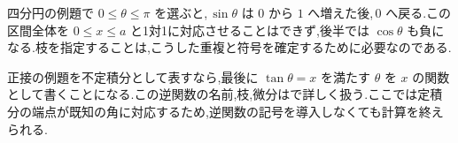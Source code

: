 四分円の例題で $0\le\theta\le\pi$ を選ぶと,\,$\sin\theta$ は $0$ から $1$ へ増えた後,\,$0$ へ戻る.この区間全体を $0\le x\le a$ と1対1に対応させることはできず,後半では $\cos\theta$ も負になる.枝を指定することは,こうした重複と符号を確定するために必要なのである.

正接の例題を不定積分として表すなら,最後に $\tan\theta=x$ を満たす $\theta$ を $x$ の関数として書くことになる.この逆関数の名前,枝,微分はで詳しく扱う.ここでは定積分の端点が既知の角に対応するため,逆関数の記号を導入しなくても計算を終えられる.

%
